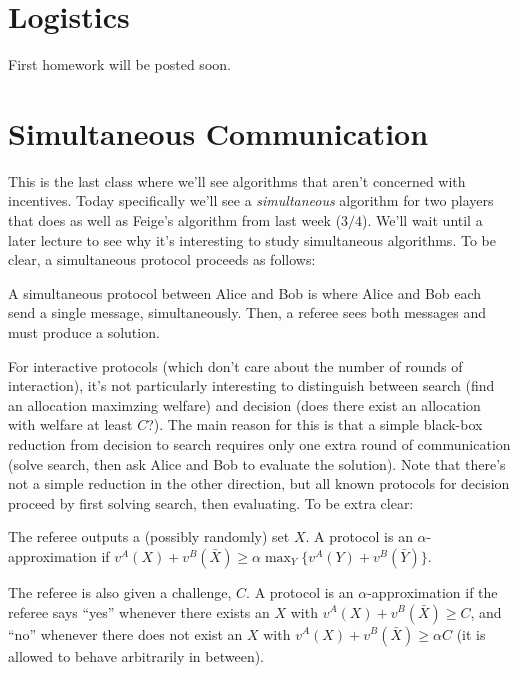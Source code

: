 

\DeclareMathOperator*{\argmax}{arg\,max}

\disclaimer 
\section{Logistics}
First homework will be posted soon. 
\section{Simultaneous Communication}
This is the last class where we'll see algorithms that aren't concerned with incentives. Today specifically we'll see a \emph{simultaneous} algorithm for two players that does as well as Feige's algorithm from last week ($3/4$). We'll wait until a later lecture to see why it's interesting to study simultaneous algorithms. To be clear, a simultaneous protocol proceeds as follows:

\begin{definition}
A simultaneous protocol between Alice and Bob is where Alice and Bob each send a single message, simultaneously. Then, a referee sees both messages and must produce a solution.
\end{definition}

For interactive protocols (which don't care about the number of rounds of interaction), it's not particularly interesting to distinguish between search (find an allocation maximzing welfare) and decision (does there exist an allocation with welfare at least $C$?). The main reason for this is that a simple black-box reduction from decision to search requires only one extra round of communication (solve search, then ask Alice and Bob to evaluate the solution). Note that there's not a simple reduction in the other direction, but all known protocols for decision proceed by first solving search, then evaluating. To be extra clear:

\begin{definition} The referee outputs a (possibly randomly) set $X$. A protocol is an $\alpha$-approximation if $v^A(X) + v^B(\bar{X}) \geq \alpha \max_Y \{v^A(Y) + v^B(\bar{Y})\}$. 
\end{definition}

\begin{definition} The referee is also given a challenge, $C$. A protocol is an $\alpha$-approximation if the referee says ``yes'' whenever there exists an $X$ with $v^A(X) + v^B(\bar{X}) \geq C$, and ``no'' whenever there does not exist an $X$ with $v^A(X) + v^B(\bar{X}) \geq \alpha C$ (it is allowed to behave arbitrarily in between).
\end{definition}


